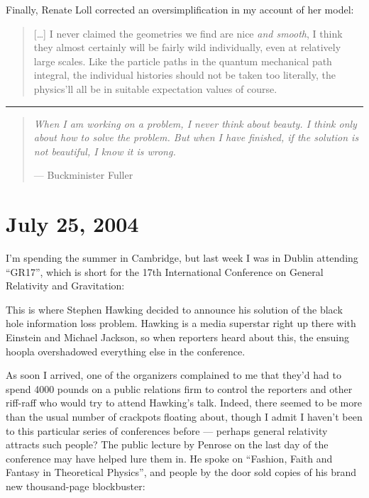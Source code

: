 \documentclass{article}
\def\tightlist{}
\renewcommand{\texttt}[1]{%
  \begingroup
  \ttfamily
  \begingroup\lccode`~=`/\lowercase{\endgroup\def~}{/\discretionary{}{}{}}%
  \begingroup\lccode`~=`[\lowercase{\endgroup\def~}{[\discretionary{}{}{}}%
  \begingroup\lccode`~=`.\lowercase{\endgroup\def~}{.\discretionary{}{}{}}%
  \catcode`/=\active\catcode`[=\active\catcode`.=\active
  \scantokens{#1\noexpand}%
  \endgroup
}
\begin{document}
Finally, Renate Loll corrected an oversimplification in my account of
her model:

\begin{quote}
{[}\ldots{]} I never claimed the geometries we find are nice \emph{and
smooth}, I think they almost certainly will be fairly wild individually,
even at relatively large scales. Like the particle paths in the quantum
mechanical path integral, the individual histories should not be taken
too literally, the physics'll all be in suitable expectation values of
course.
\end{quote}

\begin{center}\rule{0.5\linewidth}{0.5pt}\end{center}

\begin{quote}
\emph{When I am working on a problem, I never think about beauty. I
think only about how to solve the problem. But when I have finished, if
the solution is not beautiful, I know it is wrong.}

--- Buckminister Fuller
\end{quote}



\hypertarget{week207}{%
\section{July 25, 2004}\label{week207}}

I'm spending the summer in Cambridge, but last week I was in Dublin
attending ``GR17'', which is short for the 17th International Conference
on General Relativity and Gravitation:


This is where Stephen Hawking decided to announce his solution of the
black hole information loss problem. Hawking is a media superstar right
up there with Einstein and Michael Jackson, so when reporters heard
about this, the ensuing hoopla overshadowed everything else in the
conference.

As soon I arrived, one of the organizers complained to me that they'd
had to spend 4000 pounds on a public relations firm to control the
reporters and other riff-raff who would try to attend Hawking's talk.
Indeed, there seemed to be more than the usual number of crackpots
floating about, though I admit I haven't been to this particular series
of conferences before --- perhaps general relativity attracts such
people? The public lecture by Penrose on the last day of the conference
may have helped lure them in. He spoke on ``Fashion, Faith and Fantasy
in Theoretical Physics'', and people by the door sold copies of his
brand new thousand-page blockbuster:
\end{document}
